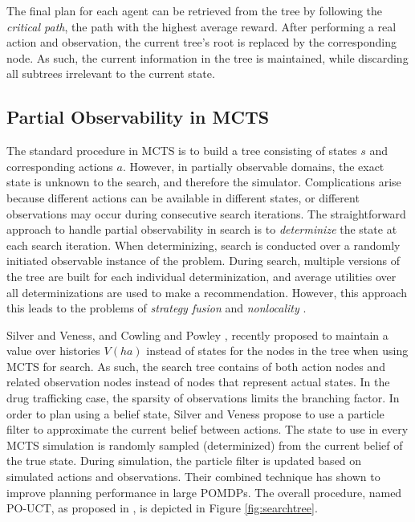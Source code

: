 \documentclass[conference]{IEEEtran}
\begin{document}
The final plan for each agent can be retrieved from the tree by following the \emph{critical path}, \ie the path with the highest average reward. After performing a real action and observation, the current tree's root is replaced by the corresponding node. As such, the current information in the tree is maintained, while discarding all subtrees irrelevant to the current state.

\subsection{Partial Observability in MCTS}
\label{sub:pomcts}

The standard procedure in MCTS is to build a tree consisting of states $s$ and corresponding actions $a$. However, in partially observable domains, the exact state is unknown to the search, and therefore the simulator. Complications arise because different actions can be available in different states, or different observations may occur during consecutive search iterations. The straightforward approach to handle partial observability in search is to \emph{determinize} the state at each search iteration. When determinizing, search is conducted over a randomly initiated observable instance of the problem. During search, multiple versions of the tree are built for each individual determinization, and average utilities over all determinizations are used to make a recommendation. However, this approach this leads to the problems of \emph{strategy fusion} and \emph{nonlocality} \cite{cowling2012information}.

Silver and Veness, and Cowling and Powley \cite{silver2010monte,cowling2012information}, recently proposed to maintain a value over histories $V(ha)$ instead of states for the nodes in the tree when using MCTS for search. As such, the search tree contains of both action nodes and related observation nodes instead of nodes that represent actual states. In the drug trafficking case, the sparsity of observations limits the branching factor. In order to plan using a belief state, Silver and Veness propose to use a particle filter to approximate the current belief between actions. The state to use in every MCTS simulation is randomly sampled (\ie determinized) from the current belief of the true state. During simulation, the particle filter is updated based on simulated actions and observations. Their combined technique has shown to improve planning performance in large POMDPs. The overall procedure, named PO-UCT, as proposed in \cite{silver2010monte}, is depicted in Figure \ref{fig:searchtree}. 
\end{document}
